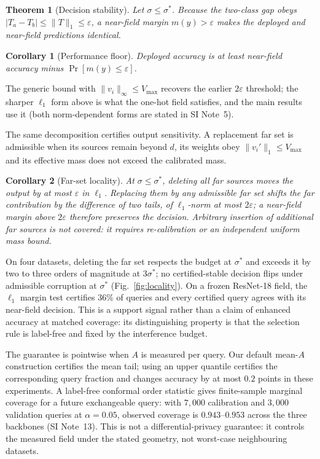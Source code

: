 \documentclass[10pt,twocolumn]{article}
\newtheorem{theorem}{Theorem}
\newtheorem{corollary}{Corollary}
\newcommand{\sstar}{\sigma^{*}}
\begin{document}
\begin{theorem}[Decision stability]\label{thm:stable}
Let $\sigma\le\sstar$. Because the two-class gap obeys $|T_a-T_b|\le\lVert T\rVert_1\le\varepsilon$, a near-field margin $m(y)>\varepsilon$ makes the deployed and near-field predictions identical.
\end{theorem}

\begin{corollary}[Performance floor]\label{cor:floor}
Deployed accuracy is at least near-field accuracy minus $\Pr[m(y)\le\varepsilon]$.
\end{corollary}

The generic bound with $\lVert v_i\rVert_\infty\le V_{\max}$ recovers the earlier $2\varepsilon$ threshold; the sharper $\ell_1$ form above is what the one-hot field satisfies, and the main results use it (both norm-dependent forms are stated in SI Note~5).

The same decomposition certifies output sensitivity. A replacement far set is admissible when its sources remain beyond $d$, its weights obey $\lVert v_i'\rVert_1\le V_{\max}$ and its effective mass does not exceed the calibrated mass.

\begin{corollary}[Far-set locality]\label{cor:locality}
At $\sigma\le\sstar$, deleting all far sources moves the output by at most $\varepsilon$ in $\ell_1$. Replacing them by any admissible far set shifts the far contribution by the difference of two tails, of $\ell_1$-norm at most $2\varepsilon$; a near-field margin above $2\varepsilon$ therefore preserves the decision. Arbitrary insertion of additional far sources is not covered: it requires re-calibration or an independent uniform mass bound.
\end{corollary}

On four datasets, deleting the far set respects the budget at $\sstar$ and exceeds it by two to three orders of magnitude at $3\sstar$; no certified-stable decision flips under admissible corruption at $\sstar$ (Fig.~\ref{fig:locality}). On a frozen ResNet-18 field, the $\ell_1$ margin test certifies $36\%$ of queries and every certified query agrees with its near-field decision. This is a support signal rather than a claim of enhanced accuracy at matched coverage: its distinguishing property is that the selection rule is label-free and fixed by the interference budget.

The guarantee is pointwise when $A$ is measured per query. Our default mean-$A$ construction certifies the mean tail; using an upper quantile certifies the corresponding query fraction and changes accuracy by at most $0.2$ points in these experiments. A label-free conformal order statistic gives finite-sample marginal coverage for a future exchangeable query: with $7{,}000$ calibration and $3{,}000$ validation queries at $\alpha=0.05$, observed coverage is $0.943$--$0.953$ across the three backbones (SI Note~13). This is not a differential-privacy guarantee: it controls the measured field under the stated geometry, not worst-case neighbouring datasets.
\end{document}
